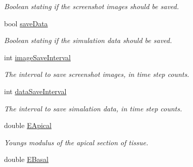 \begin{DoxyCompactItemize}
\begin{DoxyCompactList}\small\item\em Boolean stating if the screenshot images should be saved. \end{DoxyCompactList}\item 
\hypertarget{classSimulation_a7d0d5e335aeaefff71fee46ee73d0cba}{}bool \hyperlink{classSimulation_a7d0d5e335aeaefff71fee46ee73d0cba}{save\+Data}\label{classSimulation_a7d0d5e335aeaefff71fee46ee73d0cba}

\begin{DoxyCompactList}\small\item\em Boolean stating if the simulation data should be saved. \end{DoxyCompactList}\item 
\hypertarget{classSimulation_acc8ebf021a21da302f6aabb24a9c5d87}{}int \hyperlink{classSimulation_acc8ebf021a21da302f6aabb24a9c5d87}{image\+Save\+Interval}\label{classSimulation_acc8ebf021a21da302f6aabb24a9c5d87}

\begin{DoxyCompactList}\small\item\em The interval to save screenshot images, in time step counts. \end{DoxyCompactList}\item 
\hypertarget{classSimulation_afa3a518b104d571d442f9752c7e3cf92}{}int \hyperlink{classSimulation_afa3a518b104d571d442f9752c7e3cf92}{data\+Save\+Interval}\label{classSimulation_afa3a518b104d571d442f9752c7e3cf92}

\begin{DoxyCompactList}\small\item\em The interval to save simalation data, in time step counts. \end{DoxyCompactList}\item 
\hypertarget{classSimulation_a624c8f135227f36c3749fb12b89f6937}{}double \hyperlink{classSimulation_a624c8f135227f36c3749fb12b89f6937}{E\+Apical}\label{classSimulation_a624c8f135227f36c3749fb12b89f6937}

\begin{DoxyCompactList}\small\item\em Young\textquotesingle{}s modulus of the apical section of tissue. \end{DoxyCompactList}\item 
\hypertarget{classSimulation_ac36c6cc857bb7cdb84ccf9c17ef5bcba}{}double \hyperlink{classSimulation_ac36c6cc857bb7cdb84ccf9c17ef5bcba}{E\+Basal}\label{classSimulation_ac36c6cc857bb7cdb84ccf9c17ef5bcba}


\end{DoxyCompactItemize}
